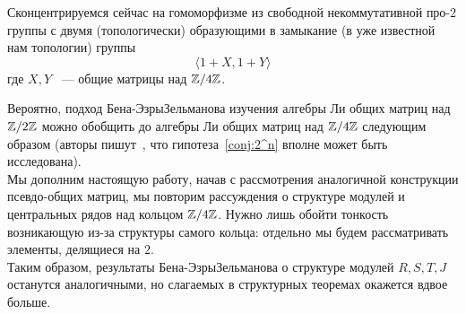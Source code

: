 Сконцентрируемся сейчас на гомоморфизме из свободной некоммутативной про-$2$ группы с двумя (топологически) образующими в замыкание (в уже известной нам топологии) группы
\[\langle 1+X, 1+Y \rangle\]
где $X,Y$ ~--- общие матрицы над $\mathbb{Z}/4\mathbb{Z}$.

Вероятно, подход Бена-Эзры\textemdash Зельманова изучения алгебры Ли общих матриц над $\mathbb{Z}/2\mathbb{Z}$ можно обобщить до алгебры Ли общих матриц над $\mathbb{Z}/4\mathbb{Z}$ следующим образом (авторы пишут~\cite{Ben-Ezra-Zelmanov}, что гипотеза~\ref{conj:2^n} вполне может быть исследована).\\
Мы дополним настоящую работу, начав с рассмотрения аналогичной конструкции псевдо-общих матриц, мы повторим рассуждения о структуре модулей и центральных рядов над кольцом $\mathbb{Z}/4\mathbb{Z}$.
Нужно лишь обойти тонкость возникающую из-за структуры самого кольца: отдельно мы будем рассматривать элементы, делящиеся на $2$.\\
Таким образом, результаты Бена-Эзры\textemdash Зельманова о структуре модулей $R, S, T, J$ останутся аналогичными, но слагаемых в структурных теоремах окажется вдвое больше.

